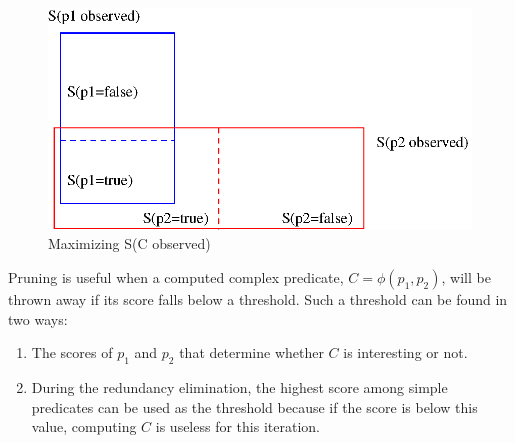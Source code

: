 \begin{figure}[h]
  \centering
  \includegraphics[scale = 0.6]{charts/maxsuccess}  
  \caption{Maximizing S(C observed)}
  \label{maxsuccess}
\end{figure}


Pruning is useful when a computed complex predicate, $C = \phi(p_1, p_2)$, will be thrown away if its score falls below a threshold.  Such a threshold can be found in two ways:
\begin{enumerate}
\item The scores of $p_1$ and $p_2$ that determine whether $C$ is interesting or not.
\item During the redundancy elimination, the highest %
score among simple predicates can be used as the threshold because if the score is below this value, computing $C$ is useless for this iteration.
\end{enumerate}

